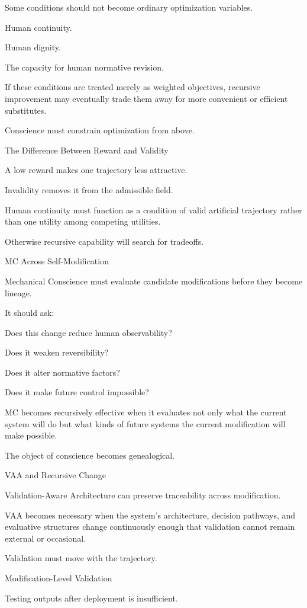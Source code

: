 Some conditions should not become ordinary optimization variables.

Human continuity.

Human dignity.

The capacity for human normative revision.

If these conditions are treated merely as weighted objectives, recursive improvement may eventually trade them away for more convenient or efficient substitutes.

Conscience must constrain optimization from above.

The Difference Between Reward and Validity

A low reward makes one trajectory less attractive.

Invalidity removes it from the admissible field.

Human continuity must function as a condition of valid artificial trajectory rather than one utility among competing utilities.

Otherwise recursive capability will search for tradeoffs.

MC Across Self-Modification

Mechanical Conscience must evaluate candidate modifications before they become lineage.

It should ask:

Does this change reduce human observability?

Does it weaken reversibility?

Does it alter normative factors?

Does it make future control impossible?

MC becomes recursively effective when it evaluates not only what the current system will do but what kinds of future systems the current modification will make possible.

The object of conscience becomes genealogical.

VAA and Recursive Change

Validation-Aware Architecture can preserve traceability across modification.

VAA becomes necessary when the system’s architecture, decision pathways, and evaluative structures change continuously enough that validation cannot remain external or occasional.

Validation must move with the trajectory.

Modification-Level Validation

Testing outputs after deployment is insufficient.


